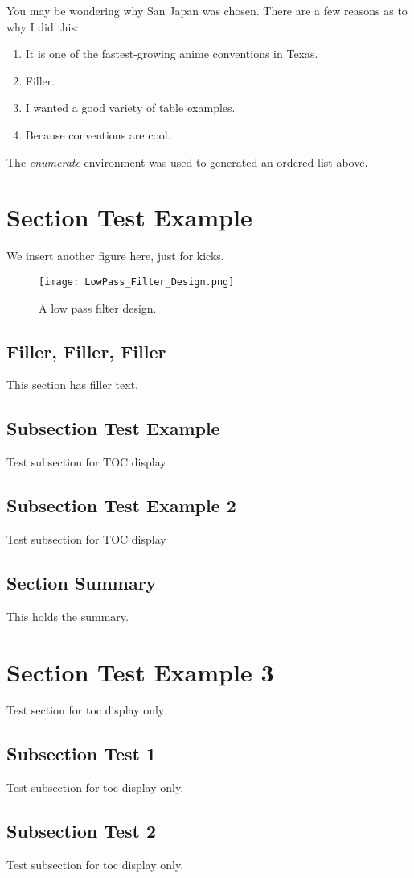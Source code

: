 You may be wondering why San Japan was chosen. There are a few reasons as to why I did this:

\begin{enumerate}
\item It is one of the fastest-growing anime conventions in Texas.
\item Filler.
\item I wanted a good variety of table examples.
\item Because conventions are cool.
\end{enumerate}

The \textit{enumerate} environment was used to generated an ordered list above.

\section{Section Test Example}
We insert another figure here, just for kicks.

\begin{figure}[h!]
	\centering
	\texttt{[image: LowPass\_Filter\_Design.png]}
	\caption{A low pass filter design.}
\end{figure}

\subsection{Filler, Filler, Filler}

This section has filler text.

\subsection{Subsection Test Example}
Test subsection for TOC display

\subsection{Subsection Test Example 2}
Test subsection for TOC display

\subsection{Section Summary}
  
This holds the summary.

\section{Section Test Example 3}
Test section for toc display only

\subsection{Subsection Test 1}
Test subsection for toc display only.

\subsection{Subsection Test 2}
Test subsection for toc display only.
